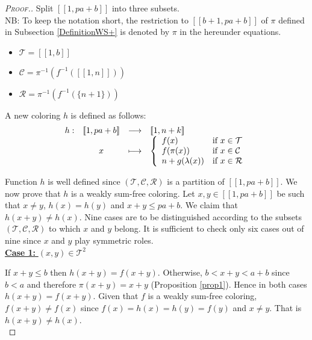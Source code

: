 \begin{proof}[\textsc{Proof.}]
Split \([\![1, p a + b]\!]\) into three subsets. \\
NB: To keep the notation short, the restriction to \([\![b + 1, p a + b]\!]\) of \(\pi\) defined in Subsection \ref{DefinitionWS+}
is denoted by \(\pi\) in the hereunder equations.

\begin{itemize}
	\item \(\mathcal{T} = [\![1, b]\!]\)
	\item \(\mathcal{C} = \pi^{-1}(f^{-1}([\![1, n]\!]))\)
	\item \(\mathcal{R} = \pi^{-1}(f^{-1}(\{n + 1\}))\)
\end{itemize}

A new coloring \(h\) is defined as follows:
\[
\begin{array}{c c c l}
	h : & [\![1, p a + b]\!] & \longrightarrow & [\![1,n+k]\!] \\
	& x & \longmapsto &
	\left\{ \begin{array}{l l}
		f(x) & \text{if}~x \in \mathcal{T} \\
		f(\pi(x)) & \text{if}~x \in \mathcal{C} \\
		n + g(\lambda(x)) & \text{if}~x \in \mathcal{R}
	\end{array} \right.
\end{array}
\]

Function \(h\) is well defined since \((\mathcal{T}, \mathcal{C}, \mathcal{R})\) is a partition of  \([\![1, p a + b]\!]\).
We now prove that \(h\) is a weakly sum-free coloring. Let \(x,y \in [\![1, p a + b]\!]\) be such that \(x \neq y\),
\(h(x) = h(y)\) and \(x+y \leqslant p a+ b\). We claim that \(h(x+y) \neq h(x)\). Nine cases are to be distinguished
according to the subsets \((\mathcal{T}, \mathcal{C}, \mathcal{R})\) to which \(x\) and \(y\) belong. It is
sufficient to check only six cases out of nine since \(x\) and \(y\) play symmetric roles. \\

\noindent \underline{\textbf{Case 1:} \((x,y) \in \mathcal{T}^2\)}
\par
If \(x + y \leqslant b\) then \(h(x+y)=f(x+y)\). Otherwise, \(b < x+y < a+b\) since \(b < a\) and
therefore \(\pi(x + y) = x +y\) (Proposition \ref{prop1}). Hence in both cases \(h(x+y)=f(x+y)\). Given that
\(f\) is a weakly sum-free coloring, \(f(x + y) \neq f(x)\) since \(f(x)=h(x)=h(y)=f(y)\) and \(x \neq y \). That
is \(h(x + y) \neq h(x)\). \\


\end{proof}
